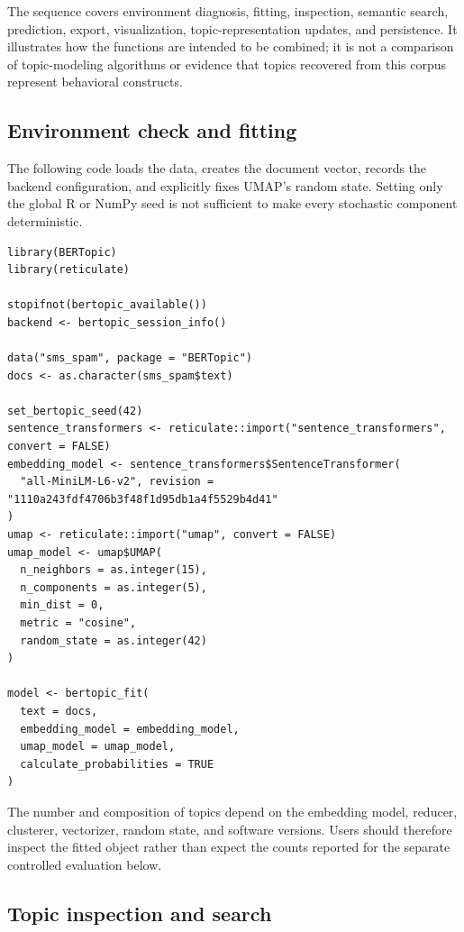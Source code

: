 \documentclass[12pt]{article}
\begin{document}
The sequence covers environment diagnosis, fitting, inspection, semantic search, prediction, export, visualization, topic-representation updates, and persistence. It illustrates how the functions are intended to be combined; it is not a comparison of topic-modeling algorithms or evidence that topics recovered from this corpus represent behavioral constructs.

\subsection{Environment check and fitting}

The following code loads the data, creates the document vector, records the backend configuration, and explicitly fixes UMAP's random state. Setting only the global R or NumPy seed is not sufficient to make every stochastic component deterministic.

\begin{lstlisting}[caption={Checking the backend and fitting a BERTopic model from R.}]
library(BERTopic)
library(reticulate)

stopifnot(bertopic_available())
backend <- bertopic_session_info()

data("sms_spam", package = "BERTopic")
docs <- as.character(sms_spam$text)

set_bertopic_seed(42)
sentence_transformers <- reticulate::import("sentence_transformers", convert = FALSE)
embedding_model <- sentence_transformers$SentenceTransformer(
  "all-MiniLM-L6-v2", revision = "1110a243fdf4706b3f48f1d95db1a4f5529b4d41"
)
umap <- reticulate::import("umap", convert = FALSE)
umap_model <- umap$UMAP(
  n_neighbors = as.integer(15),
  n_components = as.integer(5),
  min_dist = 0,
  metric = "cosine",
  random_state = as.integer(42)
)

model <- bertopic_fit(
  text = docs,
  embedding_model = embedding_model,
  umap_model = umap_model,
  calculate_probabilities = TRUE
)
\end{lstlisting}

The number and composition of topics depend on the embedding model, reducer, clusterer, vectorizer, random state, and software versions. Users should therefore inspect the fitted object rather than expect the counts reported for the separate controlled evaluation below.

\subsection{Topic inspection and search}
\end{document}
